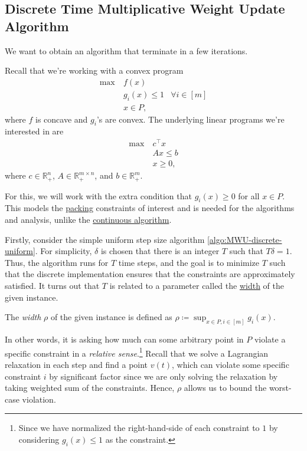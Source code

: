 \subsection{Discrete Time Multiplicative Weight Update Algorithm}
We want to obtain an algorithm that terminate in a few iterations.

\begin{prev}
	Recall that we're working with a convex program
	\[
		\begin{aligned}
			\max~ & f(x)                              \\
			      & g_i(x) \leq 1 & \forall i \in [m] \\
			      & x \in P,
		\end{aligned}
	\]
	where \(f\) is concave and \(g_i\)'s are convex. The underlying linear programs we're interested in are
	\[
		\begin{aligned}
			\max~ & c^{\top} x \\
			      & Ax \leq b  \\
			      & x \geq 0,
		\end{aligned}
	\]
	where \(c \in \mathbb{R} _{+}^n\), \(A \in \mathbb{R} _{+}^{m \times n}\), and \(b \in \mathbb{R} _{+}^m\).
\end{prev}

For this, we will work with the extra condition that \(g_i(x) \geq 0\) for all \(x \in P\). This models the \hyperref[def:packing-LP]{packing} constraints of interest and is needed for the algorithms and analysis, unlike the \hyperref[algo:MWU-continuous]{continuous algorithm}.

Firstly, consider the simple uniform step size algorithm \autoref{algo:MWU-discrete-uniform}. For simplicity, \(\delta \) is chosen that there is an integer \(T\) such that \(T \delta = 1\). Thus, the algorithm runs for \(T\) time steps, and the goal is to minimize \(T\) such that the discrete implementation ensures that the constraints are approximately satisfied. It turns out that \(T\) is related to a parameter called the \hyperref[def:width]{width} of the given instance.

\begin{definition}[Width]\label{def:width}
	The \emph{width} \(\rho \) of the given instance is defined as \(\rho \coloneqq \sup _{x \in P, i \in [m]} g_i(x)\).
\end{definition}

In other words, it is asking how much can some arbitrary point in \(P\) violate a specific constraint in a \emph{relative sense}.\footnote{Since we have normalized the right-hand-side of each constraint to \(1\) by considering \(g_i(x) \leq 1\) as the constraint.} Recall that we solve a Lagrangian relaxation in each step and find a point \(v(t)\), which can violate some specific constraint \(i\) by  significant factor since we are only solving the relaxation by taking weighted sum of the constraints. Hence, \(\rho \) allows us to bound the worst-case violation.

